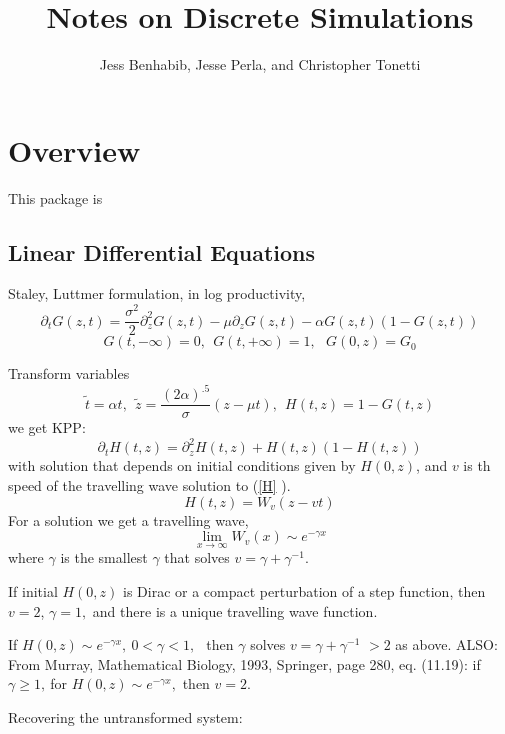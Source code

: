 \documentclass[11pt]{article}
\theoremstyle{definition}
\begin{document}
\title{Notes on Discrete Simulations}
\author{Jess Benhabib, Jesse Perla, and Christopher Tonetti}
\maketitle

\section{Overview}
This package is 

\subsection{Linear Differential Equations}


Staley, Luttmer formulation, in log productivity,%
\[
\partial _{t}G\left( z,t\right) =\frac{\sigma ^{2}}{2}\partial
_{z}^{2}G\left( z,t\right) -\mu \partial _{z}G\left( z,t\right) -\alpha
G\left( z,t\right) \left( 1-G\left( z,t\right) \right) 
\]%
\[
G\left( t,-\infty \right) =0,\ \ G\left( t,+\infty \right) =1,\ \ \ G\left(
0,z\right) =G_{0} 
\]

Transform variables%
\[
\tilde{t}=\alpha t,\ \ \tilde{z}=\frac{\left( 2\alpha \right) ^{.5}}{\sigma }%
\left( z-\mu t\right) ,\ \ H\left( t,z\right) =1-G(t,z)
\]%
we get KPP:%
\begin{equation}
\partial _{t}H\left( t,z\right) =\partial _{z}^{2}H\left( t,z\right)
+H\left( t,z\right) \left( 1-H\left( t,z\right) \right)   \label{H}
\end{equation}%
with solution that depends on initial conditions given by $H\left(
0,z\right) $, and $v$ is th speed of the travelling wave solution to (\ref{H}%
).%
\[
H\left( t,z\right) =W_{v}\left( z-vt\right) 
\]%
For a solution we get a travelling wave, 
\[
\lim_{x\rightarrow \infty }W_{v}\left( x\right) \sim e^{-\gamma x}
\]%
where $\gamma $ is the smallest $\gamma $ that solves $v=\gamma +\gamma
^{-1}.$

If initial $H\left( 0,z\right) $ is Dirac or a compact perturbation of a
step function, then $v=2$, $\gamma =1,$ and there is a unique travelling
wave function.

If $H\left( 0,z\right) \sim e^{-\gamma x},\ 0<\gamma <1,\ $\ then $\gamma $
solves $v=\gamma +\gamma ^{-1}$ $>2$ as above. ALSO: From Murray,
Mathematical Biology, 1993, Springer, page 280, eq. (11.19): if $\gamma \geq
1,\ $for $H\left( 0,z\right) \sim e^{-\gamma x},$ then $v=2.$

Recovering the untransformed system: 
\end{document}
